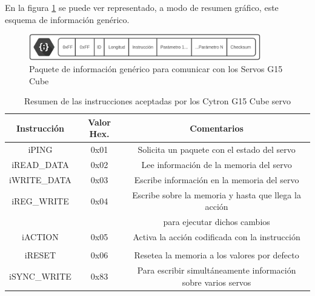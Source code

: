    En la figura \ref{fig:app:registrosg15:comunicacion_mensaje} se puede ver representado, a modo de resumen gráfico, este esquema de información genérico.

    \begin{figure}[H]
    	\centering
    	\includegraphics[width=0.9\textwidth]{figuras/Imagenes_SW/Packet_G15.jpg}
    	\caption{Paquete de información genérico para comunicar con los Servos G15 Cube}
    	\label{fig:app:registrosg15:comunicacion_mensaje}
    \end{figure}


	\begin{table}[htbp]
		\centering
		\caption{Resumen de las instrucciones aceptadas por los Cytron G15 Cube servo}
		\label{tab:g15_instructions}
		\begin{center}
			\begin{tabular}{|c|c|c|}
			\hline
			\textbf{Instrucción} & \textbf{Valor Hex.} & \textbf{Comentarios} \\
			\hline
			iPING & 0x01 & Solicita un paquete con el estado del servo \\
			\hline
			iREAD\_DATA & 0x02 & Lee información de la memoria del servo \\
			\hline
			iWRITE\_DATA & 0x03 & Escribe información en la memoria del servo \\
			\hline
			iREG\_WRITE & 0x04 & Escribe sobre la memoria y hasta que llega la acción \\ &&  \ingles{ACTION} para ejecutar dichos cambios \\
			\hline
			iACTION & 0x05 & Activa la acción codificada con la instrucción \\ && \ingles{REG\_WRITE} \\
			\hline
			iRESET & 0x06 & Resetea la memoria a los valores por defecto \\
			\hline
			iSYNC\_WRITE & 0x83 & Para escribir simultáneamente información sobre varios servos \\
			\hline
			\end{tabular}
		\end{center}
	\end{table}

